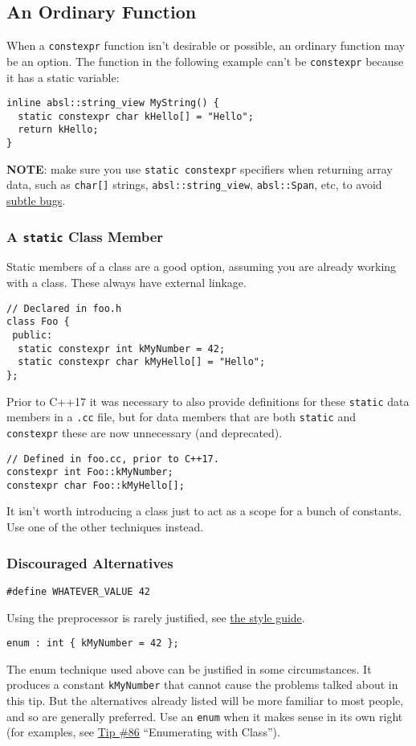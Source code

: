 \subsection{An Ordinary Function}
When a \texttt{constexpr} function isn’t desirable or possible, an ordinary function may be an option. The function in the following example can’t be \texttt{constexpr} because it has a static variable:
\begin{verbatim}
inline absl::string_view MyString() {
  static constexpr char kHello[] = "Hello";
  return kHello;
}
\end{verbatim}
\textbf{NOTE}: make sure you use \texttt{static constexpr} specifiers when returning array data, such as \texttt{char[]} strings, \texttt{absl::string_view}, \texttt{absl::Span}, etc, to avoid \hyperref[subsubsec:string-view-mistake]{subtle bugs}.

\subsubsection{A \texttt{static} Class Member}
Static members of a class are a good option, assuming you are already working with a class. These always have external linkage.
\begin{verbatim}
// Declared in foo.h
class Foo {
 public:
  static constexpr int kMyNumber = 42;
  static constexpr char kMyHello[] = "Hello";
};
\end{verbatim}
Prior to C++17 it was necessary to also provide definitions for these \texttt{static} data members in a \texttt{.cc} file, but for data members that are both \texttt{static} and \texttt{constexpr} these are now unnecessary (and deprecated).
\begin{verbatim}
// Defined in foo.cc, prior to C++17.
constexpr int Foo::kMyNumber;
constexpr char Foo::kMyHello[];
\end{verbatim}
It isn’t worth introducing a class just to act as a scope for a bunch of constants. Use one of the other techniques instead.

\subsubsection{Discouraged Alternatives}
\begin{verbatim}
#define WHATEVER_VALUE 42
\end{verbatim}
Using the preprocessor is rarely justified, see \hyperref[sec:preprocessor-macros]{the style guide}.
\begin{verbatim}
enum : int { kMyNumber = 42 };
\end{verbatim}
The enum technique used above can be justified in some circumstances. It produces a constant \texttt{kMyNumber} that cannot cause the problems talked about in this tip. But the alternatives already listed will be more familiar to most people, and so are generally preferred. Use an \texttt{enum} when it makes sense in its own right (for examples, see \hyperref[ch:tip-of-the-week-86]{Tip \#86} \enquote{Enumerating with Class}).

